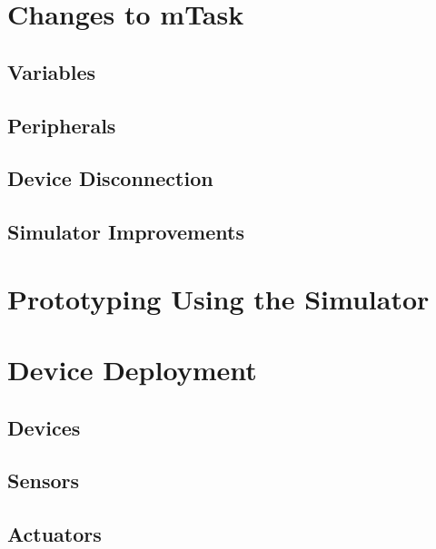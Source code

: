 
\section{Changes to mTask}
\subsection{Variables}
\subsection{Peripherals}
\subsection{Device Disconnection}
\subsection{Simulator Improvements}

\section{Prototyping Using the Simulator}

\section{Device Deployment}
\subsection{Devices}
\subsection{Sensors}
\subsection{Actuators}

